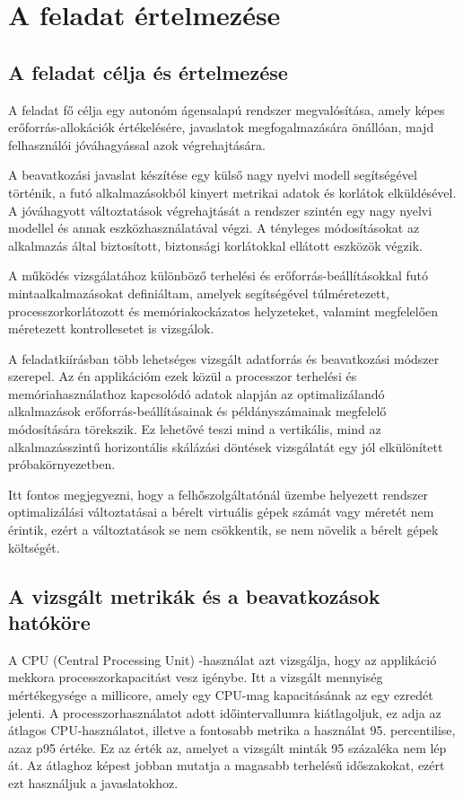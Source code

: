 \chapter{A feladat értelmezése}

\section{ A feladat célja és értelmezése}
A feladat fő célja egy autonóm ágensalapú rendszer megvalósítása, amely képes erőforrás-allokációk
értékelésére, javaslatok megfogalmazására önállóan, majd felhasználói jóváhagyással azok végrehajtására.

A beavatkozási javaslat készítése egy külső nagy nyelvi modell segítségével történik,
a futó alkalmazásokból kinyert metrikai adatok és korlátok elküldésével. A jóváhagyott változtatások végrehajtását a
rendszer szintén egy nagy nyelvi modellel és annak eszközhasználatával végzi. A tényleges módosításokat az alkalmazás 
által biztosított, biztonsági korlátokkal ellátott eszközök végzik.

A működés vizsgálatához különböző terhelési és erőforrás-beállításokkal futó mintaalkalmazásokat definiáltam, amelyek
segítségével túlméretezett, processzorkorlátozott és memóriakockázatos helyzeteket,
valamint megfelelően méretezett kontrollesetet is vizsgálok.

A feladatkiírásban több lehetséges vizsgált adatforrás és beavatkozási módszer szerepel.
Az én applikációm ezek közül a processzor terhelési és memóriahasználathoz kapcsolódó adatok alapján
az optimalizálandó alkalmazások erőforrás-beállításainak és példányszámainak megfelelő módosítására
törekszik. Ez lehetővé teszi mind a vertikális, mind az alkalmazásszintű horizontális skálázási döntések
vizsgálatát egy jól elkülönített próbakörnyezetben.

Itt fontos megjegyezni, hogy a felhőszolgáltatónál üzembe helyezett rendszer optimalizálási változtatásai
a bérelt virtuális gépek számát vagy méretét nem érintik, ezért
a változtatások se nem csökkentik, se nem növelik a bérelt gépek költségét.

\section{A vizsgált metrikák és a beavatkozások hatóköre}
A CPU (Central Processing Unit) -használat azt vizsgálja, hogy az applikáció mekkora processzorkapacitást
vesz igénybe. Itt a vizsgált mennyiség mértékegysége a millicore, amely egy CPU-mag
kapacitásának az egy ezredét jelenti. A processzorhasználatot adott időintervallumra kiátlagoljuk, ez adja az átlagos
CPU-használatot, illetve a fontosabb metrika a használat 95. percentilise, azaz p95 értéke. Ez az érték az, amelyet a
vizsgált minták 95 százaléka nem lép át. Az átlaghoz képest jobban mutatja a magasabb terhelésű időszakokat, ezért ezt használjuk
a javaslatokhoz.\\

